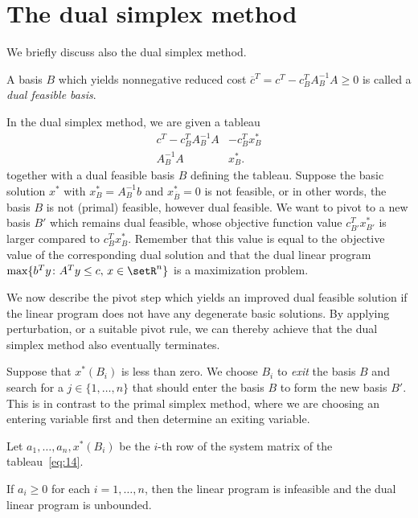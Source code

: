 \section{The dual simplex method}
We briefly discuss also the dual simplex method. 

\begin{definition}
  A basis $B$ which yields nonnegative reduced cost $\overline{c}^T =
  c^T - c_B^TA_B^{-1}A \geq0$ is called a \emph{dual feasible basis}.
\end{definition}

In the dual simplex method, we are given a tableau 
\begin{equation}
  \label{eq:14}
  \begin{array}{c|c}
    c^T - c_B^TA_B^{-1}A & -c_B^Tx^*_B \\ \hline 
    A_B^{-1}A        & x^*_B.
  \end{array}
\end{equation}
together with a dual feasible basis $B$ defining the tableau. 
Suppose the basic solution $x^*$ with $x^*_B = A_B^{-1}b$ and $x^*_{\overline{B}} =
0$ is not feasible, or in other words, the basis $B$ is not (primal)
feasible, however dual feasible. We want to pivot to a new basis $B'$
which remains dual feasible, whose objective function value
$c_{B'}^Tx^*_{B'}$ is larger compared to $c_B^Tx^*_B$. Remember that
this value is equal to the objective value of the corresponding dual
solution and that  the dual linear program $\max\{b^Ty \colon A^Ty\leq c, \, x \in
\setR^n\}$  is a maximization problem. 

We now describe the pivot step which yields an improved dual feasible
solution if the linear program does not have any degenerate basic
solutions. By applying perturbation, or a suitable pivot rule, we can
thereby achieve that the dual simplex method also eventually
terminates. 


Suppose that $x^*(B_i)$ is less than zero. We choose $B_i$ to
\emph{exit} the basis $B$ and search for a $j \in \{1,\ldots,n\}$ that
should enter the basis $B$ to form the new basis $B'$. This is in
contrast to the primal simplex method, where we are choosing an
entering variable first and then determine an exiting variable. 


Let $a_1,\ldots,a_n, x^*(B_i)$ be the $i$-th row of the system matrix of
the tableau~\eqref{eq:14}. 

\begin{lemma}\label{lem:5}
  If $a_i\geq0$ for each $i=1,\ldots,n$, then the linear program is
  infeasible and the dual linear program is unbounded.   
\end{lemma}

